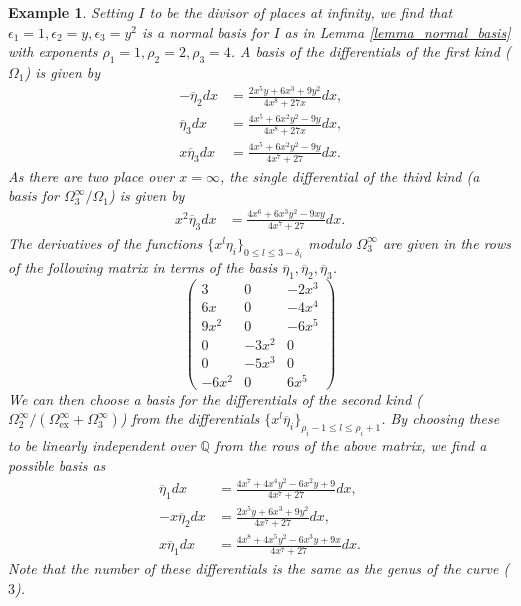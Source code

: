 \documentclass[12pt,reqno]{amsart}
\numberwithin{equation}{section}
\newtheorem{example}[theorem]{Example}
\newcommand{\op}[1]  { \operatorname{ #1 }}
\newcommand{\bbQ}[0]  { \mathbb{Q}}
\begin{document}
\begin{example}
Setting $I$ to be the divisor of places at infinity, we find that $\epsilon_1=1,\epsilon_2=y,\epsilon_3=y^2$ is a normal basis for $I$ as in Lemma \ref{lemma_normal_basis} with exponents $\rho_1=1, \rho_2=2, \rho_3=4$. A basis of the differentials of the first kind ($\Omega_1$) is given by
\begin{align*}
-\overline{\eta}_2 dx &= \frac{2 x^5 y+6 x^3+9 y^2}{4 x^8+27 x} dx\text{,}\\
\overline{\eta}_3 dx &= \frac{4 x^5+6 x^2 y^2-9 y}{4 x^8+27 x} dx\text{,}\\
x\overline{\eta}_3 dx &= \frac{4 x^5+6 x^2 y^2-9 y}{4 x^7+27} dx\text{.}
\end{align*}
As there are two place over $x=\infty$, the single differential of the third kind (a basis for $\Omega_3^{\infty}/\Omega_1$) is given by
\begin{align*}
x^2 \overline{\eta}_3 dx &= \frac{4 x^6+6 x^3 y^2-9 x y}{4 x^7+27} dx\text{.}
\end{align*}
The derivatives of the functions $\{x^l \eta_i\}_{0\le l \le 3-\delta_i}$ modulo $\Omega_3^{\infty}$ are given in the rows of the following matrix in terms of the basis $\overline{\eta}_1,\overline{\eta}_2,\overline{\eta}_3$.
\begin{equation*}
\left(
\begin{array}{ccc}
 3 & 0 & -2 x^3 \\
 6 x & 0 & -4 x^4 \\
 9 x^2 & 0 & -6 x^5 \\
 0 & -3 x^2 & 0 \\
 0 & -5 x^3 & 0 \\
 -6 x^2 & 0 & 6 x^5
\end{array}
\right)
\end{equation*}
We can then choose a basis for the differentials of the second kind ($\Omega_2^{\infty}/(\Omega_{\op{ex}}^{\infty}+\Omega_3^{\infty})$) from the differentials $\{ x^{l} \overline{\eta}_i \}_{\rho_i-1 \le l \le \rho_i+1}$. By choosing these to be linearly independent over $\bbQ$ from the rows of the above matrix, we find a possible basis as
\begin{align*}
\overline{\eta}_1 dx &= \frac{4 x^7+4 x^4 y^2-6 x^2 y+9}{4 x^7+27} dx\text{,}\\
-x\overline{\eta}_2 dx &= \frac{2 x^5 y+6 x^3+9 y^2}{4 x^7+27} dx\text{,}\\
x\overline{\eta}_1 dx &= \frac{4 x^8+4 x^5 y^2-6 x^3 y+9x}{4 x^7+27} dx\text{.}
\end{align*}
Note that the number of these differentials is the same as the genus of the curve ($3$).
\end{example}
\end{document}
